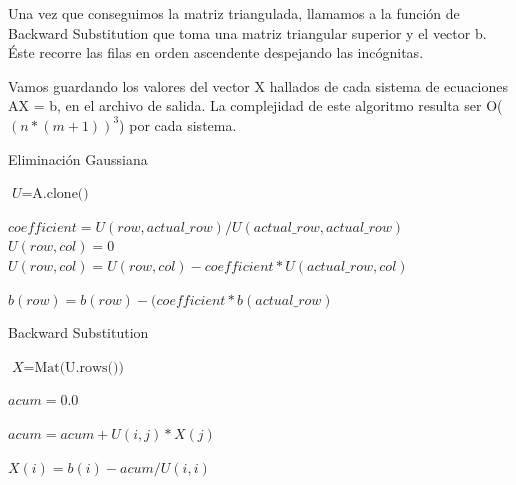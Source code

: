 Una vez que conseguimos la matriz triangulada, llamamos a la función de Backward Substitution que toma una matriz triangular superior y el vector b. Éste recorre las filas en orden ascendente despejando las incógnitas. 

Vamos guardando los valores del vector X hallados de cada sistema de ecuaciones AX = b, en el archivo de salida. La complejidad de este algoritmo resulta ser O($(n*(m+1))^{3}$) por cada sistema. 


\begin{algorithm}
\caption{Eliminación Gaussiana}\label{euclid}
\begin{algorithmic}[1]


    \State $\textit{U} = \text{A.clone()}$

        \Return
      \EndIf

          \State $coefficient = U(row, actual\_row) / U(actual\_row, actual\_row)$
              \State $U(row,col) = 0$
            \Else
              \State $U(row, col) = U(row, col) - coefficient * U(actual\_row, col)$
            \EndIf
          \EndFor

          \State $b(row) = b(row) - (coefficient * b(actual\_row)$
      \EndFor    
    \EndFor

  \EndFunction

\end{algorithmic}
\end{algorithm}

\begin{algorithm}
\caption{Backward Substitution}\label{euclid}
\begin{algorithmic}[1]


    \State $\textit{X} = \text{Mat(U.rows())}$

      \State $acum = 0.0$

        \State $acum = acum + U(i, j) * X(j)$
      \EndFor

      \State $X(i) = b(i) - acum / U(i, i)$

    \EndFor
      
  \EndFunction

\end{algorithmic}
\end{algorithm}


